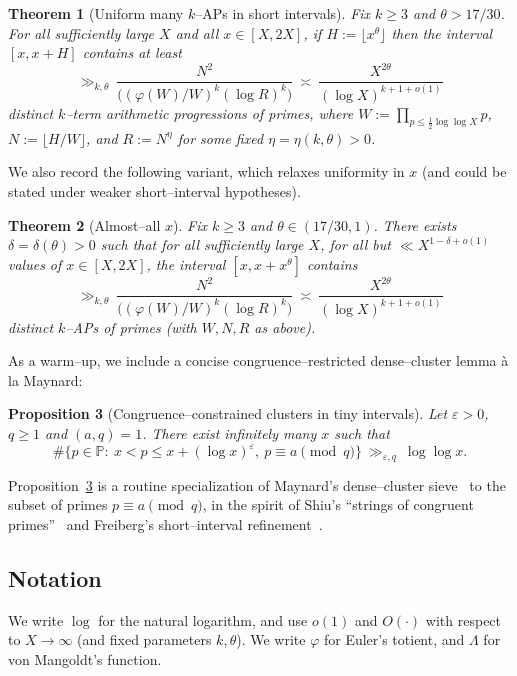 \documentclass[11pt]{amsart}
\newtheorem{theorem}{Theorem}[section]
\newtheorem{proposition}[theorem]{Proposition}
\theoremstyle{definition}
\theoremstyle{remark}
\numberwithin{equation}{section}
\begin{document}
\begin{theorem}[Uniform many $k$--APs in short intervals]\label{thm:uniform}
Fix $k\ge3$ and $\theta>17/30$. For all sufficiently large $X$ and all $x\in[X,2X]$, if $H:=\lfloor x^{\theta}\rfloor$ then the interval $[x,x+H]$ contains at least
\[
\gg_{k,\theta}\ \frac{N^{2}}{\big((\varphi(W)/W)^{k}(\log R)^{k}\big)}\ \asymp\ \frac{X^{2\theta}}{(\log X)^{k+1+o(1)}}
\]
distinct $k$--term arithmetic progressions of primes, where $W:=\prod_{p\le \tfrac12\log\log X}p$, $N:=\lfloor H/W\rfloor$, and $R:=N^\eta$ for some fixed $\eta=\eta(k,\theta)>0$.
\end{theorem}

We also record the following variant, which relaxes uniformity in $x$ (and could be stated under weaker short--interval hypotheses).

\begin{theorem}[Almost--all $x$]\label{thm:almostall}
Fix $k\ge3$ and $\theta\in(17/30,1)$. There exists $\delta=\delta(\theta)>0$ such that for all sufficiently large $X$, for all but $\ll X^{1-\delta+o(1)}$ values of $x\in[X,2X]$, the interval $[x,x+x^\theta]$ contains
\[
\gg_{k,\theta}\ \frac{N^{2}}{\big((\varphi(W)/W)^{k}(\log R)^{k}\big)}\ \asymp\ \frac{X^{2\theta}}{(\log X)^{k+1+o(1)}}
\]
distinct $k$--APs of primes (with $W,N,R$ as above).
\end{theorem}

As a warm--up, we include a concise congruence--restricted dense--cluster lemma à la Maynard:
\begin{proposition}[Congruence--constrained clusters in tiny intervals]\label{prop:clusters}
Let $\varepsilon>0$, $q\ge1$ and $(a,q)=1$. There exist infinitely many $x$ such that
\[
\#\big\{p\in\mathbb P:\ x<p\le x+(\log x)^{\varepsilon},\ p\equiv a\!\!\pmod q\big\}\ \gg_{\varepsilon,q}\ \log\log x.
\]
\end{proposition}

Proposition~\ref{prop:clusters} is a routine specialization of Maynard's dense--cluster sieve~\cite{MaynardCompositio} to the subset of primes $p\equiv a\pmod q$, in the spirit of Shiu's ``strings of congruent primes''~\cite{Shiu} and Freiberg's short--interval refinement~\cite{Freiberg}.

\subsection*{Notation}
We write $\log$ for the natural logarithm, and use $o(1)$ and $O(\cdot)$ with respect to $X\to\infty$ (and fixed parameters $k,\theta$). We write $\varphi$ for Euler's totient, and $\Lambda$ for von Mangoldt's function.
\end{document}
